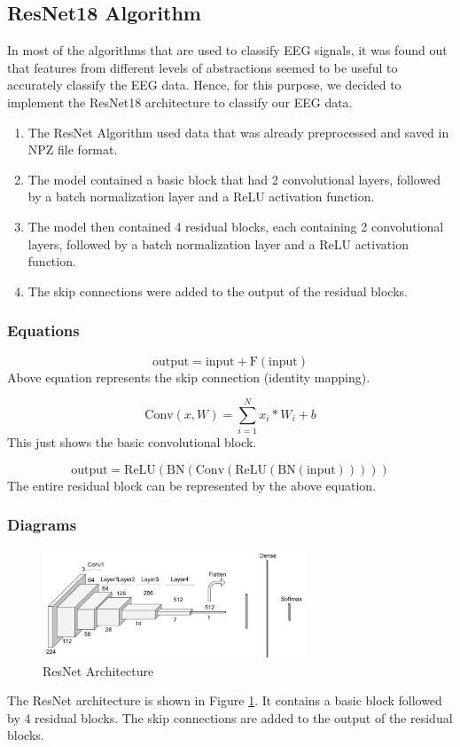 \documentclass[10pt]{article}
\begin{document}
\subsection{ResNet18 Algorithm}
In most of the algorithms that are used to classify EEG signals, it was found out that features from different levels of abstractions seemed to be useful to accurately classify the EEG data. Hence, for this purpose, we decided to implement the ResNet18 architecture to classify our EEG data.
\begin{enumerate}
    \item The ResNet Algorithm used data that was already preprocessed and saved in NPZ file format.
    \item The model contained a basic block that had 2 convolutional layers, followed by a batch normalization layer and a ReLU activation function.
    \item The model then contained 4 residual blocks, each containing 2 convolutional layers, followed by a batch normalization layer and a ReLU activation function.
    \item The skip connections were added to the output of the residual blocks.
\end{enumerate}

\subsubsection{Equations}
\[
\text{output} = \text{input} + \text{F}(\text{input})
\]
Above equation represents the skip connection (identity mapping).

\[
\text{Conv}(x, W) = \sum_{i=1}^{N} x_i \ast W_i + b
\]
This just shows the basic convolutional block.

\[
\text{output} = \text{ReLU}(\text{BN}(\text{Conv}(\text{ReLU}(\text{BN}(\text{input})))))
\]
The entire residual block can be represented by the above equation.

\subsubsection{Diagrams}
\begin{figure}[H]
    \centering
    \includegraphics[width=0.7\textwidth]{resnet.png}
    \caption{ResNet Architecture}
    \label{fig:resnet_arch}
\end{figure}
The ResNet architecture is shown in Figure \ref{fig:resnet_arch}. It contains a basic block followed by 4 residual blocks. The skip connections are added to the output of the residual blocks.
\end{document}
